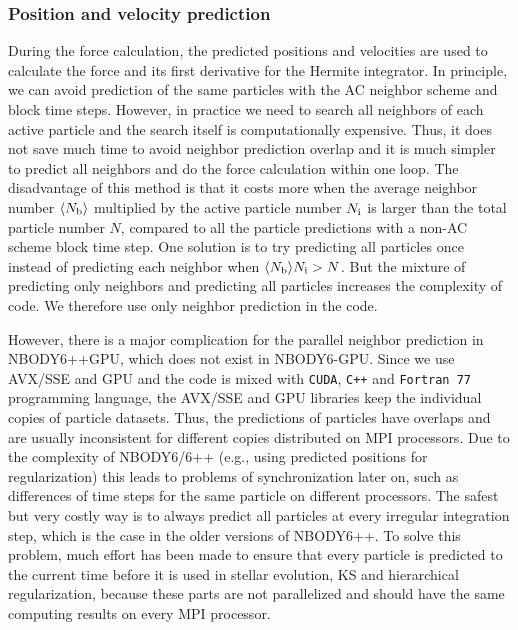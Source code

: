 \documentclass[usenatbib,aas_macros]{mn2e}
\begin{document}
\subsubsection{Position and velocity prediction}

During the force calculation, the predicted positions and velocities are used to calculate the force and its first derivative for the Hermite integrator. 
In principle, we can avoid prediction of the same particles with the AC neighbor scheme and block time steps. 
However, in practice we need to search all neighbors of each active particle and the search itself is computationally expensive. 
Thus, it does not save much time to avoid neighbor prediction overlap and it is much simpler to predict all neighbors and do the force calculation within one loop. 
The disadvantage of this method is that it costs more when the average neighbor number $\langle N_{\rm b} \rangle$ multiplied by the active particle number $N_{\rm i}$ is larger than the total particle number $N$,
compared to all the particle predictions with a non-AC scheme block time step. 
One solution is to try predicting all particles once instead of predicting each neighbor when $\langle N_{\rm b} \rangle N_{\rm i} > N$. 
But the mixture of predicting only neighbors and predicting all particles increases the complexity of code. 
We therefore use only neighbor prediction in the code.

However, there is a major complication for the parallel neighbor prediction in NBODY6++GPU, which does not exist in NBODY6-GPU.
Since we use AVX/SSE and GPU and the code is mixed with \texttt{CUDA}, \texttt{C++} and \texttt{Fortran~77} programming language, the AVX/SSE and GPU libraries keep the individual copies of particle datasets. 
Thus, the predictions of particles have overlaps and are usually inconsistent for different copies distributed on MPI processors.
Due to the complexity of NBODY6/6++ (e.g., using predicted positions for regularization) this leads to problems of synchronization later on, such as differences of time steps for the same particle on different processors.
The safest but very costly way is to always predict all particles at every irregular integration step, which is the case in the older versions of NBODY6++.
To solve this problem, much effort has been made to ensure that every particle is predicted to the current time before it is used in stellar evolution, KS and hierarchical regularization, because these parts are not parallelized and should have the same computing results on every MPI processor.
\end{document}
